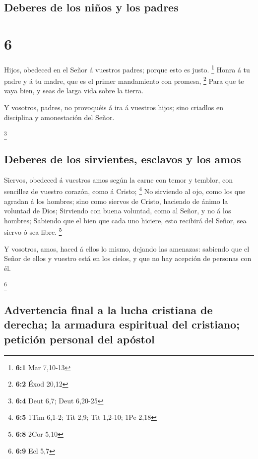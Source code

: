 \hypertarget{deberes-de-los-niuxf1os-y-los-padres}{%
\subsection{Deberes de los niños y los
padres}\label{deberes-de-los-niuxf1os-y-los-padres}}

\hypertarget{section-5}{%
\section{6}\label{section-5}}

 Hijos, obedeced en el Señor á vuestros padres; porque
esto es justo. \footnote{\textbf{6:1} Mar 7,10-13}  Honra
á tu padre y á tu madre, que es el primer mandamiento con promesa,
\footnote{\textbf{6:2} Éxod 20,12}  Para que te vaya bien,
y seas de larga vida sobre la tierra.

 Y vosotros, padres, no provoquéis á ira á vuestros hijos;
sino criadlos en disciplina y amonestación del Señor.

\footnote{\textbf{6:4} Deut 6,7; Deut 6,20-25}

\hypertarget{deberes-de-los-sirvientes-esclavos-y-los-amos}{%
\subsection{Deberes de los sirvientes, esclavos y los
amos}\label{deberes-de-los-sirvientes-esclavos-y-los-amos}}

 Siervos, obedeced á vuestros amos según la carne con
temor y temblor, con sencillez de vuestro corazón, como á Cristo;
\footnote{\textbf{6:5} 1Tim 6,1-2; Tit 2,9; Tit 1,2-10; 1Pe 2,18}
 No sirviendo al ojo, como los que agradan á los hombres;
sino como siervos de Cristo, haciendo de ánimo la voluntad de Dios;
 Sirviendo con buena voluntad, como al Señor, y no á los
hombres;  Sabiendo que el bien que cada uno hiciere, esto
recibirá del Señor, sea siervo ó sea libre. \footnote{\textbf{6:8} 2Cor
  5,10}

 Y vosotros, amos, haced á ellos lo mismo, dejando las
amenazas: sabiendo que el Señor de ellos y vuestro está en los cielos, y
que no hay acepción de personas con él.

\footnote{\textbf{6:9} Ecl 5,7}

\hypertarget{advertencia-final-a-la-lucha-cristiana-de-derecha-la-armadura-espiritual-del-cristiano-peticiuxf3n-personal-del-apuxf3stol}{%
\subsection{Advertencia final a la lucha cristiana de derecha; la
armadura espiritual del cristiano; petición personal del
apóstol}\label{advertencia-final-a-la-lucha-cristiana-de-derecha-la-armadura-espiritual-del-cristiano-peticiuxf3n-personal-del-apuxf3stol}}

